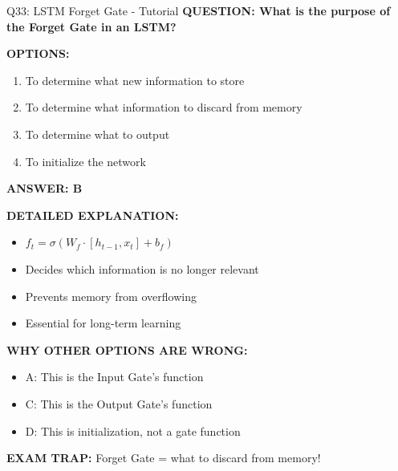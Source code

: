 \documentclass[8pt]{beamer}
\begin{document}
	\begin{frame}{Q33: LSTM Forget Gate - Tutorial}
		\fontsize{6.5}{7.5}\selectfont
		\textbf{QUESTION: What is the purpose of the Forget Gate in an LSTM?}
		
		\vspace{0.1cm}
		\textbf{OPTIONS:}
		\begin{enumerate}
			\item To determine what new information to store
			\item To determine what information to discard from memory
			\item To determine what to output
			\item To initialize the network
		\end{enumerate}
		
		\vspace{0.1cm}
		\textcolor{myblue}{\textbf{ANSWER: B}}
		
		\vspace{0.1cm}
		\textbf{DETAILED EXPLANATION:}
		\begin{itemize}
			\item $f_t = \sigma(W_f \cdot [h_{t-1}, x_t] + b_f)$
			\item Decides which information is no longer relevant
			\item Prevents memory from overflowing
			\item Essential for long-term learning
		\end{itemize}
		
		\vspace{0.1cm}
		\textcolor{myred}{\textbf{WHY OTHER OPTIONS ARE WRONG:}}
		\begin{itemize}
			\item \textcolor{myred}{A:} This is the Input Gate's function
			\item \textcolor{myred}{C:} This is the Output Gate's function
			\item \textcolor{myred}{D:} This is initialization, not a gate function
		\end{itemize}
		
		\textcolor{myred}{\textbf{EXAM TRAP:}} Forget Gate = \textcolor{myblue}{what to discard from memory}!
	\end{frame}
	
\end{document}
